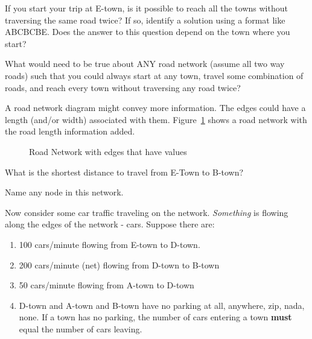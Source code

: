 \begin{clevel}
If you start your trip at E-town, is it possible to reach all the towns without traversing the same road twice? If so, identify a solution using a format like ABCBCBE. Does the answer to this question depend on the town where you start?
\end{clevel}

\begin{dlevel}
What would need to be true about ANY road network (assume all two way roads) such that you could always start at any town, travel some combination of roads, and reach every town without traversing any road twice?
\end{dlevel}

A road network diagram might convey more information. The edges could have a length (and/or width) associated with them. Figure~\ref{F:1RNb} shows a road network with the road length information added. 

\par
\begin{figure}[H]
\begin{center}
\caption{Road Network with edges that have values}
\label{F:1RNb}
\end{center}
\end{figure}

\begin{alevel}
What is the shortest distance to travel from E-Town to B-town?
\end{alevel}
\begin{alevel}
Name any node in this network.
\end{alevel}
\noindent
Now consider some car traffic traveling on the network. \emph{Something} is flowing along the edges of the network - cars. Suppose there are:
\begin{enumerate}
\item 100 cars/minute flowing from E-town to D-town.  
\item 200 cars/minute (net) flowing from D-town to B-town
\item 50 cars/minute flowing from A-town to D-town
\item D-town and A-town and B-town have no parking at all, anywhere, zip, nada, none. If a town has no parking, the number of cars entering a town \textbf{must} equal the number of cars leaving.
\end{enumerate}

